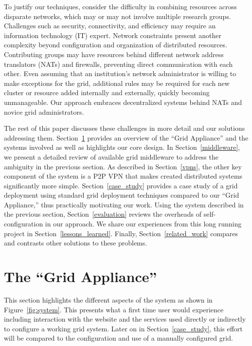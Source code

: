 \documentclass[conference]{IEEEtran}
\begin{document}
To justify our techniques, consider the difficulty in combining resources
across disparate networks, which may or may not involve multiple research
groups.  Challenges such as security, connectivity, and efficiency may require
an information technology (IT) expert.  Network constraints present another
complexity beyond configuration and organization of distributed resources.
Contributing groups may have resources behind different network address
translators (NATs) and firewalls, preventing direct communication with each
other.  Even assuming that an institution's network administrator is willing to
make exceptions for the grid, additional rules may be required for each new
cluster or resource added internally and externally, quickly becoming
unmanageable.  Our approach embraces decentralized systems behind NATs and
novice grid administrators.

The rest of this paper discusses these challenges in more detail and our
solutions addressing them.  Section~\ref{system} provides an overview of the
``Grid Appliance'' and the systems involved as well as highlights our core
design.  In Section~\ref{middleware}, we present a detailed review of
available grid middleware to address the ambiguity in the previous section.  As
described in Section~\ref{vpns}, the other key component of the system is a P2P
VPN that makes created distributed systems significantly more simple.
Section~\ref{case_study} provides a case study of a grid deployment using
standard grid deployment techniques compared to our ``Grid Appliance,'' thus
practically motivating our work.  Using the system described in the previous
section, Section~\ref{evaluation} reviews the overheads of self-configuration
in our approach.  We share our experiences from this long running project in
Section~\ref{lessons_learned}.  Finally, Section~\ref{related_work} compares
and contrasts other solutions to these problems.

\section{The ``Grid Appliance''}
\label{system}

This section highlights the different aspects of the system as shown in
Figure~\ref{fig:system}.  This presents what a first time user would experience
including interaction with the website and the services used directly or
indirectly to configure a working grid system.  Later on in
Section~\ref{case_study}, this effort will be compared to the configuration and
use of a manually configured grid.
\end{document}
